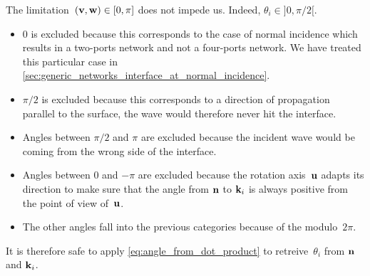 The limitation~$\left(\textbf{v}, \textbf{w}\right) \in [0, \pi]$ does not impede us.
Indeed, $\theta_i \in ]0, \pi/2[$.
\begin{itemize}
    \item 0 is excluded because this corresponds to the case of normal incidence which results in a two-ports network and not a four-ports network.  We have treated this particular case in \vref{sec:generic_networks_interface_at_normal_incidence}.
    \item $\pi/2$ is excluded because this corresponds to a direction of propagation parallel to the surface, the wave would therefore never hit the interface.
    \item Angles between $\pi/2$ and $\pi$ are excluded because the incident wave would be coming from the wrong side of the interface.
    \item Angles between 0 and $-\pi$ are excluded because the rotation axis~$\textbf{u}$ adapts its direction to make sure that the angle from $\textbf{n}$ to $\textbf{k}_i$ is always positive from the point of view of~$\textbf{u}$.
    \item The other angles fall into the previous categories because of the modulo~$2\pi$.
\end{itemize}
It is therefore safe to apply \cref{eq:angle_from_dot_product} to retreive~$\theta_i$ from $\textbf{n}$ and $\textbf{k}_i$.



